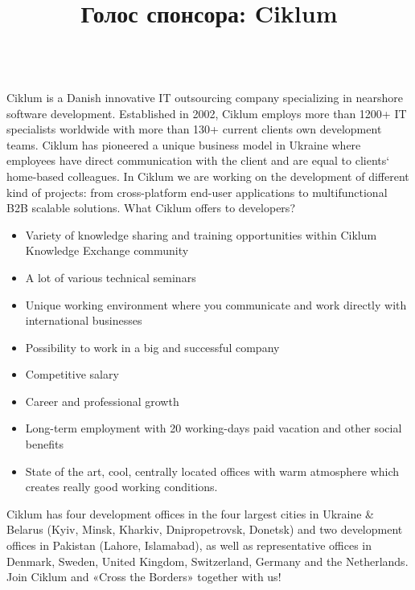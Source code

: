 \documentclass[10pt, a5paper]{article}
\begin{document}
\title{Голос спонсора: Ciklum}
\date{}
\maketitle%
\thispagestyle{empty}%
\begin{figure}[ht]%
%
\end{figure}~\\[-2.5em]\longpage\longpage
Ciklum is a Danish innovative IT outsourcing company specializing in nearshore software development. 
Established in 2002, Ciklum employs more than 1200+ IT specialists worldwide with more than 130+ current clients own development teams. Ciklum has pioneered a unique business model in Ukraine where employees have direct communication with the client and are equal to clients` home-based colleagues. In Ciklum we are working on the development of different kind of projects: from cross-platform end-user applications to multifunctional B2B scalable solutions. What Ciklum offers to developers?
\begin{itemize}
\item Variety of knowledge sharing and training opportunities within Ciklum Knowledge Exchange community
\item A lot of various technical seminars
\item Unique working environment where you communicate and work directly with international businesses
\item Possibility to work in a big and successful company
\item Competitive salary
\item Career and professional growth 
\item Long-term employment with 20 working-days paid vacation and other social benefits 
\item State of the art, cool, centrally located offices with warm \linebreak atmosphere which creates really good working conditions.
\end{itemize}
Ciklum has four development offices in the four largest cities in Ukraine \& Belarus (Kyiv, Minsk, Kharkiv, Dnipropetrovsk, Donetsk) and two development offices in Pakistan (Lahore, Islamabad), as well as \linebreak representative offices in Denmark, Sweden, United Kingdom, Switzerland, Germany and the Netherlands.\\
Join Ciklum and «Cross the Borders» together with us!
\begin{figure}[bt!]
\end{figure}
\end{document}
